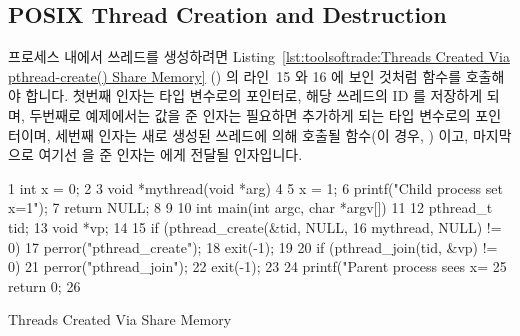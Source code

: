 \subsection{POSIX Thread Creation and Destruction}
\label{sec:toolsoftrade:POSIX Thread Creation and Destruction}

프로세스 내에서 쓰레드를 생성하려면
Listing~\ref{lst:toolsoftrade:Threads Created Via pthread-create() Share Memory}
() 의 라인~15 와 16 에 보인 것처럼  함수를
호출해야 합니다.
첫번째 인자는  타입 변수로의 포인터로, 해당 쓰레드의 ID 를
저장하게 되며, 두번째로 예제에서는  값을 준 인자는 필요하면 추가하게
되는  타입 변수로의 포인터이며, 세번째 인자는 새로 생성된
쓰레드에 의해 호출될 함수(이 경우, ) 이고, 마지막으로 여기선
 을 준 인자는  에게 전달될 인자입니다.

\begin{listing}[tbp]
{ \scriptsize
\begin{verbbox}
  1 int x = 0;
  2 
  3 void *mythread(void *arg)
  4 {
  5   x = 1;
  6   printf("Child process set x=1\n");
  7   return NULL;
  8 }
  9 
 10 int main(int argc, char *argv[])
 11 {
 12   pthread_t tid;
 13   void *vp;
 14 
 15   if (pthread_create(&tid, NULL,
 16                      mythread, NULL) != 0) {
 17     perror("pthread_create");
 18     exit(-1);
 19   }
 20   if (pthread_join(tid, &vp) != 0) {
 21     perror("pthread_join");
 22     exit(-1);
 23   }
 24   printf("Parent process sees x=%
 25   return 0;
 26 }
\end{verbbox}
}
\centering
\theverbbox
\caption{Threads Created Via  Share Memory}
\label{lst:toolsoftrade:Threads Created Via pthread-create() Share Memory}
\end{listing}

